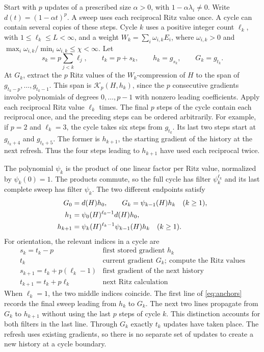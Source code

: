 \documentclass[11pt,a4paper]{article}
\numberwithin{equation}{section}
\begin{document}
Start with \(p\) updates of a prescribed size \(\alpha>0\), with \(1-\alpha\lambda_i\ne0\). Write \(d(t)=(1-\alpha t)^p\). A sweep uses each reciprocal Ritz value once. A cycle can
contain several copies of these steps. Cycle \(k\) uses a positive
integer count \(\ell_k\), with \(1\le \ell_k\le L<\infty\), and a weight \(W_k=\sum_i\omega_{i,k}E_i\), where \(\omega_{i,k}>0\) and \(\max_i\omega_{i,k}/\min_i\omega_{i,k}\le\chi<\infty\). Let
\[
 s_k=p\sum_{j<k}\ell_j,\qquad t_k=p+s_k,\qquad
 h_k=g_{s_k},\qquad G_k=g_{t_k}.
\]
At \(G_k\), extract the \(p\) Ritz values of the \(W_k\)-compression of \(H\) to the span of \(g_{t_k-p},\ldots,g_{t_k-1}\). This span is \(\mathcal K_p(H,h_k)\), since the \(p\) consecutive gradients involve polynomials of degrees \(0,\ldots,p-1\) with nonzero leading coefficients. Apply each reciprocal Ritz value \(\ell_k\) times. The final \(p\) steps of the cycle contain each reciprocal once, and the preceding steps can be ordered arbitrarily. For example, if \(p=2\) and \(\ell_k=3\), the cycle takes six steps from \(g_{t_k}\). Its last two steps start at \(g_{t_k+4}\) and \(g_{t_k+5}\). The former is \(h_{k+1}\), the starting gradient of the history at the next refresh. Thus the four steps leading to \(h_{k+1}\) have used each reciprocal twice.

The polynomial \(\psi_k\) is the product of one linear factor per Ritz value, normalized by \(\psi_k(0)=1\). The products commute, so the full cycle has filter \(\psi_k^{\ell_k}\) and its last complete sweep has filter \(\psi_k\). The two different endpoints satisfy
\begin{align}
 G_0&=d(H)h_0,\qquad G_k=\psi_{k-1}(H)h_k\quad(k\ge1),\notag\\
 h_1&=\psi_0(H)^{\ell_0-1}d(H)h_0,\notag\\
 h_{k+1}&=\psi_k(H)^{\ell_k-1}\psi_{k-1}(H)h_k\quad(k\ge1).
 \label{eq:anchors}
\end{align}
For orientation, the relevant indices in a cycle are
\[
\begin{array}{c|l}
s_k=t_k-p & \text{first stored gradient }h_k\\
t_k & \text{current gradient }G_k;\ \text{compute the Ritz values}\\
s_{k+1}=t_k+p(\ell_k-1) & \text{first gradient of the next history}\\
t_{k+1}=t_k+p\ell_k & \text{next Ritz calculation}
\end{array}
\]
When \(\ell_k=1\), the two middle indices coincide.
The first line of \eqref{eq:anchors} records the final sweep leading from \(h_k\) to \(G_k\). The next two lines propagate from \(G_k\) to \(h_{k+1}\) without using the last \(p\) steps of cycle \(k\). This distinction accounts for both filters in the last line. Through \(G_k\) exactly \(t_k\) updates have taken place. The refresh uses existing gradients, so there is no separate set of updates to create a new history at a cycle boundary.
\end{document}
